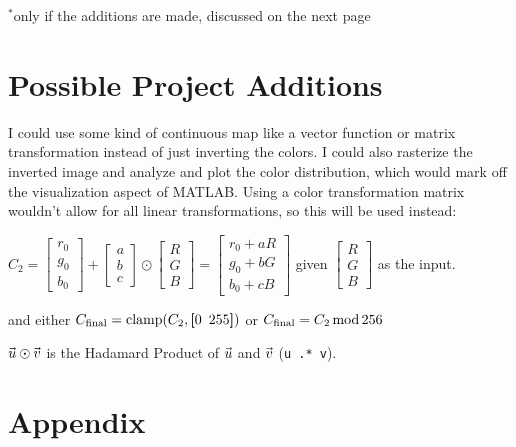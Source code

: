 \documentclass[12pt]{article}
\begin{document}
\vfill {\scriptsize $^*$only if the additions are made, discussed on the next page}

\pagebreak

\section{Possible Project Additions}

I could use some kind of continuous map like a vector function or matrix
transformation instead of just inverting the colors. I could also rasterize the
inverted image and analyze and plot the color distribution, which would mark off
the visualization aspect of MATLAB. Using a color transformation matrix wouldn't
allow for all linear transformations, so this will be used instead:

\vspace{3px}
$C_2 =\begin{bmatrix}
	r_0 \\ g_0 \\ b_0
\end{bmatrix} + \begin{bmatrix}
	a \\ b \\ c
\end{bmatrix} \! \odot \! \begin{bmatrix}
	R \\ G \\ B
\end{bmatrix} = \begin{bmatrix}
	r_0 + a R \\ g_0 + b G \\ b_0 + c B
\end{bmatrix}$ given $\begin{bmatrix}
	R \\ G \\ B
\end{bmatrix}$ as the input.

\vspace{3px}
and either $C_{\mathrm{final}} = \text{clamp}(C_2, \textbf[0~\,255\textbf])$
or $C_{\mathrm{final}} = C_2 \, \text{mod} \, 256$

$\uvec \odot \vvec$ is the Hadamard Product of $\uvec$ and $\vvec$ (\texttt{\textcolor{variable}u \textcolor{operator}{.*} \textcolor{variable}v}).

\section{Appendix}
\end{document}
